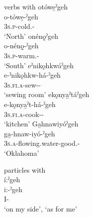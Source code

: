 \ea\label{ex:locex3} verbs with 
\ea otówe̱ˀgeh\\
\gll o-tówe̱-ˀgeh\\
 \textsc{3s.p}-cold.{\stative}-{\on}\\
\glt `North'
\ex onénǫ̱ˀgeh\\
\gll o-nénǫ̱-ˀgeh\\
 \textsc{3s.p}-warm.{\stative}-{\on}\\
\glt `South'
\ex eˀnikǫhkwáˀgeh\\
\gll e-ˀnikǫhkw-há-ˀgeh\\
 \textsc{3s.fi.a}-sew-{\habitual}-{\on}\\
\glt `sewing room'
\ex ekǫnya̱ˀtáˀgeh\\
\gll e-kǫnya̱ˀt-há-ˀgeh\\
 \textsc{3s.fi.a}-cook-{\habitual}-{\on}\\
\glt `kitchen'
\ex Ga̱hnawiyóˀgeh\\
\gll ga̱-hnaw-iyó-ˀgeh\\
 \textsc{3s.a}-flowing.water-good.{\stative}-{\on}\\
\glt `Oklahoma'
\z
\z

\ea\label{ex:locex4} particles with \\
í:ˀgeh \\
\gll i:-ˀgeh\\
 I-{\on}\\
\glt ‘on my side’, `as for me'
\z



